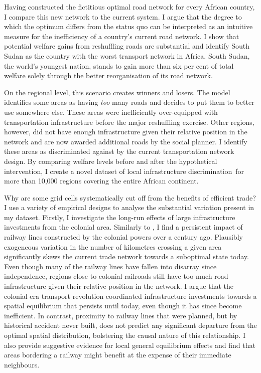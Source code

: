 \documentclass[11pt, oneside]{article}   	%
\begin{document}
Having constructed the fictitious optimal road network for every African country, I compare this new network to the current system. I argue that the degree to which the optimum differs from the status quo can be interpreted as an intuitive measure for the inefficiency of a country's current road network. I show that potential welfare gains from reshuffling roads are substantial and identify South Sudan as the country with the worst transport network in Africa. South Sudan, the world's youngest nation, stands to gain more than six per cent of total welfare solely through the better reorganisation of its road network.

On the regional level, this scenario creates winners and losers. The model identifies some areas as having \emph{too} many roads and decides to put them to better use somewhere else. These areas were inefficiently over-equipped with transportation infrastructure before the major reshuffling exercise. Other regions, however, did not have enough infrastructure given their relative position in the network and are now awarded additional roads by the social planner. I identify these areas as discriminated against by the current transportation network design. By comparing welfare levels before and after the hypothetical intervention, I create a novel dataset of local infrastructure discrimination for more than 10,000 regions covering the entire African continent.

Why are some grid cells systematically cut off from the benefits of efficient trade? I use a variety of empirical designs to analyse the substantial variation present in my dataset. Firstly, I investigate the long-run effects of large infrastructure investments from the colonial area. Similarly to \cite{jedwab_permanent_2016}, I find a persistent impact of railway lines constructed by the colonial powers over a century ago. Plausibly exogeneous variation in the number of kilometres crossing a given area significantly skews the current trade network towards a suboptimal state today. Even though many of the railway lines have fallen into disarray since independence, regions close to colonial railroads still have too much road infrastructure given their relative position in the network. I argue that the colonial era transport revolution coordinated infrastructure investments towards a spatial equilibrium that persists until today, even though it has since become inefficient. In contrast, proximity to railway lines that were planned, but by historical accident never built, does not predict any significant departure from the optimal spatial distribution, bolstering the causal nature of this relationship. I also provide suggestive evidence for local general equilibrium effects and find that areas bordering a railway might benefit at the expense of their immediate neighbours.
\end{document}

